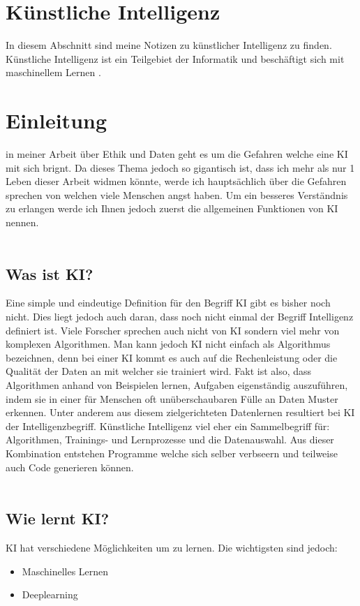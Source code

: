 \section{Künstliche Intelligenz}
\label{sec:ai}

In diesem Abschnitt sind meine Notizen zu künstlicher Intelligenz zu finden.
Künstliche Intelligenz ist ein Teilgebiet der Informatik und beschäftigt sich mit maschinellem Lernen \citep{ai-wikipedia}.

\section{Einleitung}
in meiner Arbeit über Ethik und Daten geht es um die Gefahren welche eine KI mit sich brignt. Da dieses Thema jedoch so gigantisch ist, dass ich mehr als nur 1 Leben dieser Arbeit widmen könnte, werde ich hauptsächlich über die Gefahren sprechen von welchen viele Menschen angst haben.
Um ein besseres Verständnis zu erlangen werde ich Ihnen jedoch zuerst die allgemeinen Funktionen von KI nennen.
\\
\\
\subsection{Was ist KI?}
Eine simple und eindeutige Definition für den Begriff KI gibt es bisher noch nicht. Dies liegt jedoch auch daran, dass noch nicht einmal der Begriff Intelligenz definiert ist.
Viele Forscher sprechen auch nicht von KI sondern viel mehr von komplexen Algorithmen. Man kann jedoch KI nicht einfach als Algorithmus bezeichnen, denn bei einer KI kommt es auch auf die Rechenleistung oder die Qualität der Daten an mit welcher sie trainiert wird. 
Fakt ist also, dass Algorithmen anhand von Beispielen lernen, Aufgaben eigenständig auszuführen, indem sie in einer für Menschen oft unüberschaubaren Fülle an Daten Muster erkennen. Unter anderem aus diesem zielgerichteten Datenlernen resultiert bei KI der Intelligenzbegriff.
Künstliche Intelligenz viel eher ein Sammelbegriff für: Algorithmen, Trainings- und Lernprozesse und die Datenauswahl. Aus dieser Kombination entstehen Programme welche sich selber verbseern und teilweise auch Code generieren können. \citep{Was-ist-KI?}
\\
\\
\subsection{Wie lernt KI?}
KI hat verschiedene Möglichkeiten um zu lernen. Die wichtigsten sind jedoch:
\begin{itemize}
    \item Maschinelles Lernen
    \item Deeplearning
\end{itemize}

